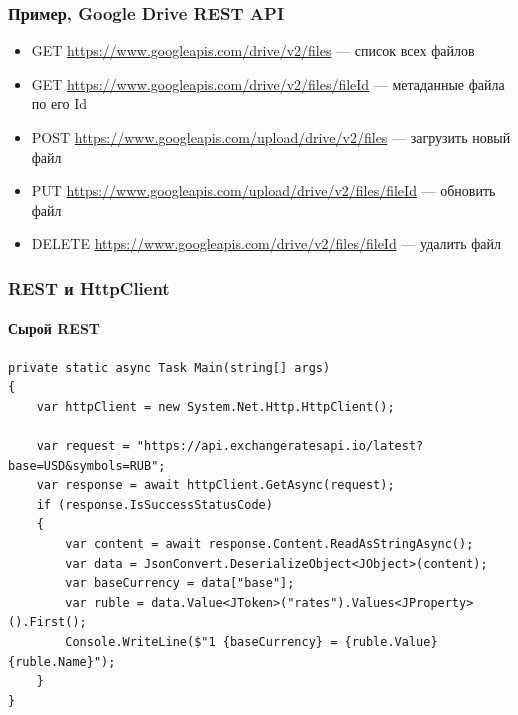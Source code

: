 \documentclass[xetex,mathserif,serif]{beamer}
\begin{document}
    \begin{frame}
        \frametitle{Пример, Google Drive REST API}
        \begin{itemize}
            \item GET \url{https://www.googleapis.com/drive/v2/files} --- список всех файлов
            \item GET \url{https://www.googleapis.com/drive/v2/files/fileId} --- метаданные файла по его Id
            \item POST \url{https://www.googleapis.com/upload/drive/v2/files} — загрузить новый файл
            \item PUT \url{https://www.googleapis.com/upload/drive/v2/files/fileId} --- обновить файл
            \item DELETE \url{https://www.googleapis.com/drive/v2/files/fileId} --- удалить файл
        \end{itemize}
    \end{frame}

    \begin{frame}[fragile]
        \frametitle{REST и HttpClient}
        \framesubtitle{Сырой REST}
        \begin{footnotesize}
            \begin{verbatim}
private static async Task Main(string[] args)
{
    var httpClient = new System.Net.Http.HttpClient();

    var request = "https://api.exchangeratesapi.io/latest?base=USD&symbols=RUB";
    var response = await httpClient.GetAsync(request);
    if (response.IsSuccessStatusCode)
    {
        var content = await response.Content.ReadAsStringAsync();
        var data = JsonConvert.DeserializeObject<JObject>(content);
        var baseCurrency = data["base"];
        var ruble = data.Value<JToken>("rates").Values<JProperty>().First();
        Console.WriteLine($"1 {baseCurrency} = {ruble.Value} {ruble.Name}");
    }
}
            \end{verbatim}
        \end{footnotesize}
    \end{frame}
\end{document}
